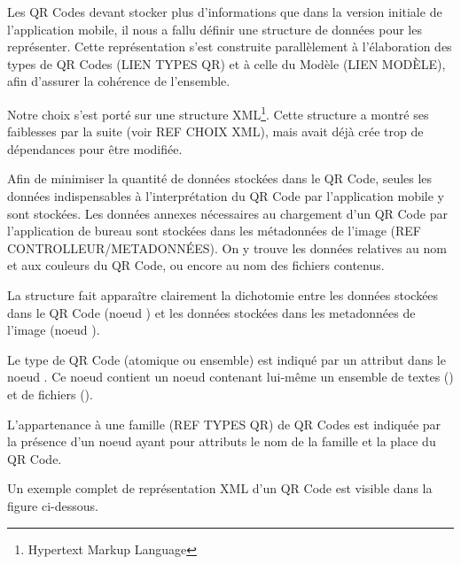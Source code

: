 \par
Les QR Codes devant stocker plus d'informations que dans la version initiale de l'application mobile, il nous a fallu définir une structure de données pour les représenter. Cette représentation s'est construite parallèlement à l'élaboration des types de QR Codes (LIEN TYPES QR) et à celle du Modèle (LIEN MODÈLE), afin d'assurer la cohérence de l'ensemble.
\par
Notre choix s'est porté sur une structure XML\footnote{Hypertext Markup Language}. Cette structure a montré ses faiblesses par la suite (voir REF CHOIX XML), mais avait déjà crée trop de dépendances pour être modifiée.\\

\par
Afin de minimiser la quantité de données stockées dans le QR Code, seules les données indispensables à l'interprétation du QR Code par l'application mobile y sont stockées. Les données annexes nécessaires au chargement d'un QR Code par l'application de bureau sont stockées dans les métadonnées de l'image (REF CONTROLLEUR/METADONNÉES). On y trouve les données relatives au nom et aux couleurs du QR Code, ou encore au nom des fichiers contenus.
\par
La structure fait apparaître clairement la dichotomie entre les données stockées dans le QR Code (noeud ) et les données stockées dans les metadonnées de l'image (noeud ).\\

\par
Le type de QR Code (atomique ou ensemble) est indiqué par un attribut dans le noeud . Ce noeud contient un noeud  contenant lui-même un ensemble de textes () et de fichiers ().
\par
L'appartenance à une famille (REF TYPES QR) de QR Codes est indiquée par la présence d'un noeud  ayant pour attributs le nom de la famille et la place du QR Code.\\

\par
Un exemple complet de représentation XML d'un QR Code est visible dans la figure ci-dessous.

